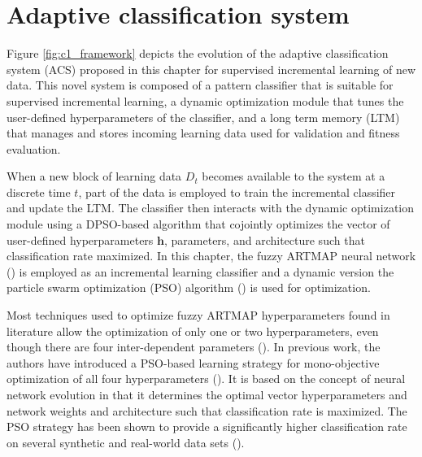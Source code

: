 \section{Adaptive classification system}
\label{sec:c1_adaptation}

Figure \ref{fig:c1_framework} depicts the evolution of the adaptive classification system (ACS) proposed in this chapter for supervised incremental learning of new data. This novel system is composed of a pattern classifier that is suitable for supervised incremental learning, a dynamic optimization module that tunes the user-defined hyperparameters of the classifier, and a long term memory (LTM) that manages and stores incoming learning data used for validation and fitness evaluation.

When a new block of learning data $D_t$ becomes available to the system at a discrete time $t$, part of the data is employed to train the incremental classifier and update the LTM. The classifier then interacts with the dynamic optimization module using a DPSO-based algorithm that cojointly optimizes the vector of user-defined hyperparameters $\textbf{h}$, parameters, and architecture such that classification rate maximized. In this chapter, the fuzzy ARTMAP neural network (\cite{carpenter92}) is employed as an incremental learning classifier and a dynamic version the particle swarm optimization (PSO) algorithm (\cite{kennedy95}) is used for optimization.


\begin{figure*}[t]
  \centering
  \caption{The evolution of a new adaptive classification system (ACS) according to generic incremental learning scenario. New blocks of data are used by the ACS to update the classifier over time. Let $D_1$, $D_2$, … be blocks of learning data available at different instants in time. The ACS starts with an initial hypothesis $hyp_0$ which constitutes the prior knowledge of the domain. Each hypothesis $hyp_{t-1}$ are updated to $hyp_t$ by the ACS on the basis of the new data block $D_t$}
	\label{fig:c1_framework}
\end{figure*}

Most techniques used to optimize fuzzy ARTMAP hyperparameters found in literature allow the optimization of only one or two hyperparameters, even though there are four inter-dependent parameters (\cite{canuto00, dubrawski97, fung03}). In previous work, the authors have introduced a PSO-based learning strategy for mono-objective optimization of all four hyperparameters (\cite{granger07}). It is based on the concept of neural network evolution in that it determines the optimal vector hyperparameters and network weights and architecture such that classification rate is maximized. The PSO strategy has been shown to provide a significantly higher classification rate on several synthetic and real-world data sets (\cite{barry07, granger07}).

